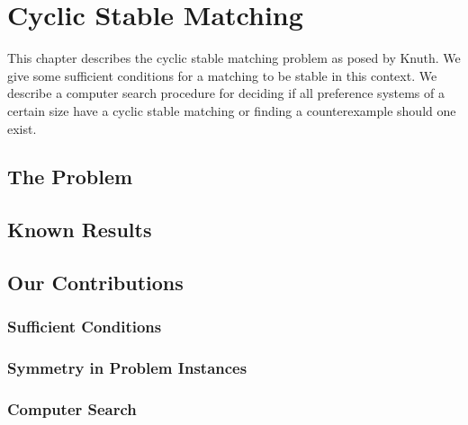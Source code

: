\chapter{Cyclic Stable Matching}
This chapter describes the cyclic stable matching problem as posed by Knuth. We give some sufficient conditions for a matching to be stable in this context. We describe a computer search procedure for deciding if all preference systems of a certain size have a cyclic stable matching or finding a counterexample should one exist. 
\section{The Problem}
\section{Known Results}
\section{Our Contributions}
\subsection{Sufficient Conditions}
\subsection{Symmetry in Problem Instances}
\subsection{Computer Search}
